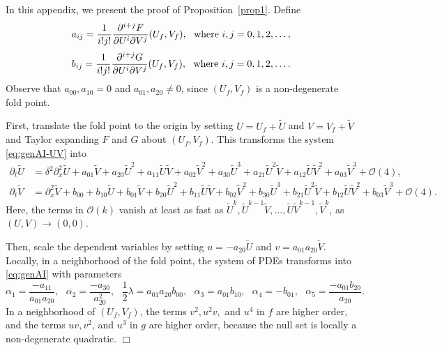 \documentclass[11pt]{article}
\numberwithin{equation}{section}
\begin{document}
In this appendix, we present the proof of Proposition~\ref{prop1}.
Define 
\begin{equation*}
a_{ij} = \frac{1}{i!j!} \frac{\partial^{i+j} F}{\partial U^i \partial V^j}(U_f,V_f), \ \ {\rm where} \, \,  i,j=0,1,2,\dots,
\end{equation*} 
\begin{equation*} 
b_{ij} = \frac{1}{i!j!} \frac{\partial^{i+j} G}{\partial U^i \partial V^j}(U_f,V_f), \ \ {\rm where} \, \,  i,j=0,1,2,\ldots.
\end{equation*} 
Observe that $a_{00}, a_{10} = 0$  
and $a_{01}, a_{20} \ne 0$,
since $(U_f,V_f)$ is a non-degenerate fold point.

First, translate the fold point to the origin by setting $U = U_f + \tilde{U}$ and $V = V_f + \tilde{V}$ and Taylor expanding $F$ and $G$ about $(U_f,V_f)$.
This transforms the system \eqref{eq:genAI-UV} into 
\begin{equation*}
\begin{split}
    \partial_{t}\tilde{U} &= \delta^2 \partial^2_x \tilde{U} + a_{01} \tilde{V} + a_{20} {\tilde{U}}^2 + a_{11} \tilde{U}\tilde{V} + a_{02} {\tilde{V}}^2 + a_{30} {\tilde{U}}^3 + a_{21} {\tilde{U}}^2{\tilde{V}} + a_{12} {\tilde{U}}{\tilde{V}}^2 + a_{03} {\tilde{V}}^3 + \mathcal{O}(4), \\
    \partial_{t}\tilde{V} &= \partial^2_x \tilde{V} + b_{00} + b_{10}\tilde{U} + b_{01} \tilde{V} + b_{20} {\tilde{U}}^2 + b_{11} \tilde{U}\tilde{V} + b_{02} {\tilde{V}}^2 
    + b_{30} {\tilde{U}}^3 + b_{21} {\tilde{U}}^2{\tilde{V}} + b_{12} {\tilde{U}}{\tilde{V}}^2 + b_{03} {\tilde{V}}^3 + \mathcal{O}(4).
\end{split}
\end{equation*}
Here, the terms in $\mathcal{O}(k)$ vanish at least as fast as $\tilde{U}^k, \tilde{U}^{k-1}\tilde{V}, \ldots, \tilde{U} \tilde{V}^{k-1}, \tilde{V}^k$, as $(U,V)\to (0,0)$.

Then, scale the dependent variables by setting $u=-a_{20}\tilde{U}$ and $v=a_{01}a_{20} \tilde{V}$.
Locally, in a neighborhood of the fold point, the system of PDEs transforms into \eqref{eq:genAI} 
with parameters
\begin{equation} \label{eq:AppA-alpha_i}
\alpha_1 = \frac{-a_{11}}{a_{01}a_{20}}, 
\ \ \ 
\alpha_2 = \frac{-a_{30}}{a^2_{20}},
\ \ \ 
\frac{1}{2}\lambda = a_{01} a_{20} b_{00}, 
\ \ \ 
\alpha_3 = a_{01} b_{10},
\ \ \ 
\alpha_4 = -b_{01},
\ \ \ 
\alpha_5 = \frac{-a_{01}b_{20}}{a_{20}}.
\end{equation}
In a neighborhood of $(U_f,V_f)$, the terms $v^2, u^2v,$ and $u^4$ in $f$ are higher order, and the terms $uv, v^2$, and $u^3$ in $g$ are higher order, because the null set is locally a non-degenerate quadratic. 
\hfill
$\Box$
\end{document}
